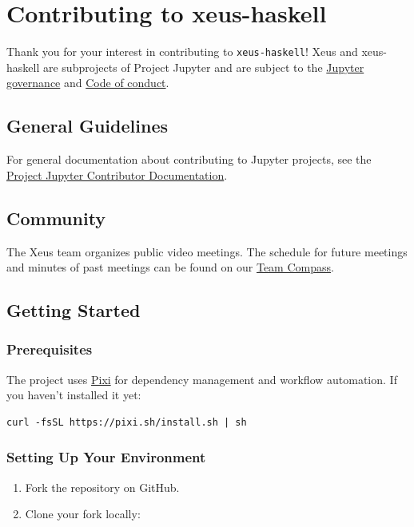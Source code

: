 \documentclass[11pt]{scrartcl}
\begin{document}
\section{Contributing to xeus-haskell}
\label{sec:contributing}


Thank you for your interest in contributing to \texttt{xeus-haskell}!
Xeus and xeus-haskell are subprojects of Project Jupyter and are subject to the \href{https://github.com/jupyter/governance}{Jupyter governance} and \href{https://github.com/jupyter/governance/blob/master/conduct/code\_of\_conduct.md}{Code of conduct}.
\subsection{General Guidelines}


For general documentation about contributing to Jupyter projects, see the \href{https://jupyter.readthedocs.io/en/latest/contributor/content-contributor.html}{Project Jupyter Contributor Documentation}.
\subsection{Community}


The Xeus team organizes public video meetings. The schedule for future meetings and minutes of past meetings can be found on our \href{https://jupyter-xeus.github.io/}{Team Compass}.
\subsection{Getting Started}


\subsubsection{Prerequisites}


The project uses \href{https://pixi.sh/}{Pixi} for dependency management and workflow automation. If you haven't installed it yet:
\begin{verbatim}
curl -fsSL https://pixi.sh/install.sh | sh
\end{verbatim}


\subsubsection{Setting Up Your Environment}


\begin{enumerate}
\item Fork the repository on GitHub.
\item Clone your fork locally:
\end{enumerate}
\end{document}
